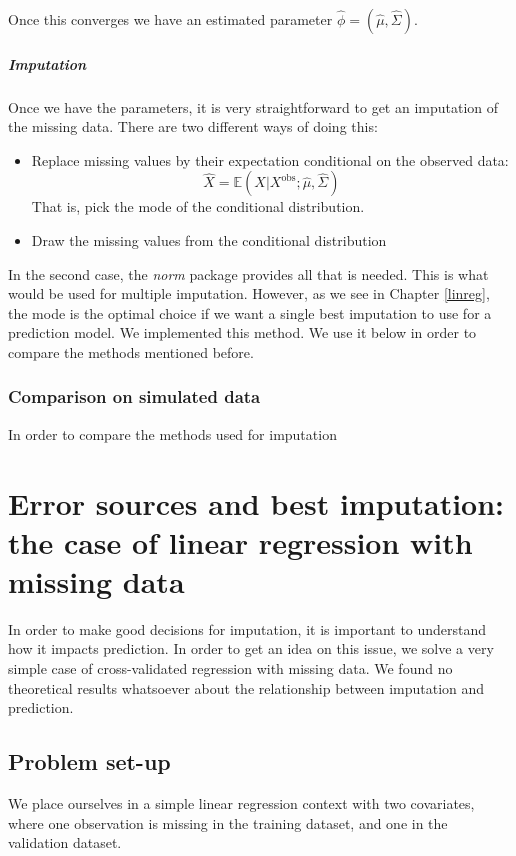 \documentclass[12pt, a4paper]{memoir}
\begin{document}
Once this converges we have an estimated parameter $\hat{\phi} = (\hat{\mu}, \hat{\Sigma})$.

\paragraph{Imputation}
Once we have the parameters, it is very straightforward to get an imputation of the missing data. There are two different ways of doing this:
\begin{itemize}
\item Replace missing values by their expectation conditional on the observed data: 
$$\hat{X} = \mathbb{E}(X \vert X^{\text{obs}} ; \hat{\mu}, \hat{\Sigma})$$
That is, pick the mode of the conditional distribution.
\item Draw the missing values from the conditional distribution
\end{itemize}

In the second case, the \emph{norm} package provides all that is needed. This is what would be used for multiple imputation. However, as we see in Chapter \ref{linreg}, the mode is the optimal choice if we want a single best imputation to use for a prediction model. We implemented this method. We use it below in order to compare the methods mentioned before.

		\subsection{Comparison on simulated data}
In order to compare the methods used for imputation
		

		
\chapter{Error sources and best imputation: the case of linear regression with missing data}
In order to make good decisions for imputation, it is important to understand how it impacts prediction. In order to get an idea on this issue, we solve a very simple case of cross-validated regression with missing data. We found no theoretical results whatsoever about the relationship between imputation and prediction. 
\label{linreg}
	\section{Problem set-up}
We place ourselves in a simple linear regression context with two covariates, where one observation is missing in the training dataset, and one in the validation dataset.
\end{document}
